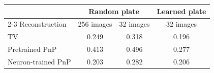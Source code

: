 \begin{tabular}{@{}lccc@{}}
\toprule
 & \multicolumn{2}{c}{Random plate} & Learned plate\\
\cmidrule(lr){2-3}
Reconstruction & 256 images & 32 images & 32 images\\
\midrule
TV & 0.249 & 0.318 & 0.196\\
Pretrained PnP & 0.413 & 0.496 & 0.277\\
Neuron-trained PnP & 0.203 & 0.282 & 0.206\\
\bottomrule
\end{tabular}
